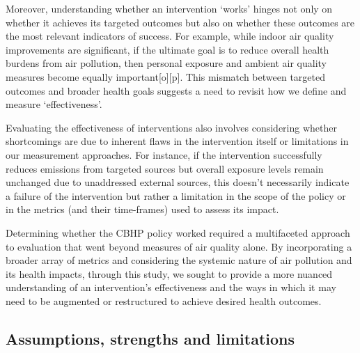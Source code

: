 \documentclass[
  letterpaper,
  DIV=11,
  numbers=noendperiod]{scrartcl}
\begin{document}
Moreover, understanding whether an intervention `works' hinges not only
on whether it achieves its targeted outcomes but also on whether these
outcomes are the most relevant indicators of success. For example, while
indoor air quality improvements are significant, if the ultimate goal is
to reduce overall health burdens from air pollution, then personal
exposure and ambient air quality measures become equally
important{[}o{]}{[}p{]}. This mismatch between targeted outcomes and
broader health goals suggests a need to revisit how we define and
measure `effectiveness'.

Evaluating the effectiveness of interventions also involves considering
whether shortcomings are due to inherent flaws in the intervention
itself or limitations in our measurement approaches. For instance, if
the intervention successfully reduces emissions from targeted sources
but overall exposure levels remain unchanged due to unaddressed external
sources, this doesn't necessarily indicate a failure of the intervention
but rather a limitation in the scope of the policy or in the metrics
(and their time-frames) used to assess its impact.

Determining whether the CBHP policy worked required a multifaceted
approach to evaluation that went beyond measures of air quality alone.
By incorporating a broader array of metrics and considering the systemic
nature of air pollution and its health impacts, through this study, we
sought to provide a more nuanced understanding of an intervention's
effectiveness and the ways in which it may need to be augmented or
restructured to achieve desired health outcomes.

\hypertarget{assumptions-strengths-and-limitations}{%
\subsection{Assumptions, strengths and
limitations}\label{assumptions-strengths-and-limitations}}
\end{document}
